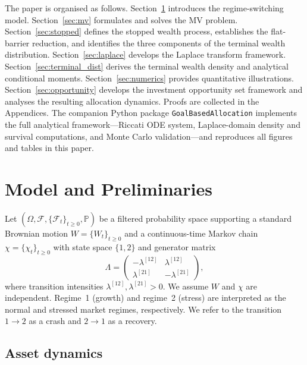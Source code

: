 \documentclass[11pt,a4paper]{article}
\numberwithin{equation}{section}
\newcommand{\Prob}{\mathbb{P}}
\newcommand{\F}{\mathcal{F}}
\begin{document}
The paper is organised as follows. Section~\ref{sec:model} introduces the regime-switching model. Section~\ref{sec:mv} formulates and solves the MV problem. Section~\ref{sec:stopped} defines the stopped wealth process, establishes the flat-barrier reduction, and identifies the three components of the terminal wealth distribution. Section~\ref{sec:laplace} develops the Laplace transform framework. Section~\ref{sec:terminal_dist} derives the terminal wealth density and analytical conditional moments. Section~\ref{sec:numerics} provides quantitative illustrations. Section~\ref{sec:opportunity} develops the investment opportunity set framework and analyses the resulting allocation dynamics. Proofs are collected in the Appendices. The companion Python package \texttt{GoalBasedAllocation} 
\citep{SeppGBA2026} implements the full analytical framework---Riccati 
ODE system, Laplace-domain density and survival computations, 
and Monte Carlo validation---and reproduces all figures and tables 
in this paper.



\section{Model and Preliminaries}\label{sec:model}


Let $(\Omega, \F, \{\F_t\}_{t \geq 0}, \Prob)$ be a filtered probability space supporting a standard Brownian motion $W = \{W_t\}_{t \geq 0}$ and a continuous-time Markov chain $\chi = \{\chi_t\}_{t \geq 0}$ with state space $\{1,2\}$ and generator matrix
\begin{equation}\label{eq:generator}
\Lambda = \begin{pmatrix} -\lambda^{[12]} & \lambda^{[12]} \\ \lambda^{[21]} & -\lambda^{[21]} \end{pmatrix},
\end{equation}
where transition intensities $\lambda^{[12]}, \lambda^{[21]} > 0$. We assume $W$ and $\chi$ are independent. Regime~1 (growth) and regime~2 (stress) are interpreted as the normal and stressed market regimes, respectively. We refer to the transition $1 \to 2$ as a crash and $2 \to 1$ as a recovery.



\subsection{Asset dynamics}\label{sec:asset}
\end{document}
